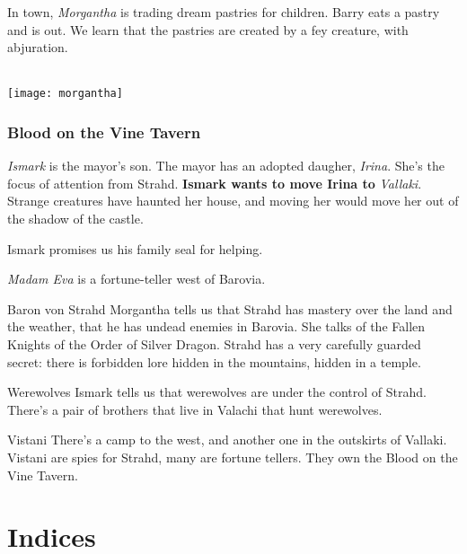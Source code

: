 \documentclass[10pt,twoside,twocolumn]{article}
\begin{document}
In town, \emph{Morgantha} is trading dream
pastries for children. Barry eats a pastry and is
out. We learn that the pastries are created by a fey creature, with abjuration.
\\\\
\centerline{\texttt{[image: morgantha]}}

\subsubsection{Blood on the Vine Tavern}
\textit{Ismark} is the mayor's son. The
mayor has an adopted daugher,
\textit{Irina}. She's the focus of attention
from Strahd. \textbf{Ismark wants to move Irina to }\emph{Vallaki}. Strange creatures
have haunted her house, and moving her would move her out of the
shadow of the castle.

Ismark promises us his family seal for helping.

\emph{Madam Eva} is a fortune-teller west of Barovia.

\begin{paperbox}{Baron von Strahd}
Morgantha tells us that Strahd has mastery over the land and the
weather, that he has undead enemies in Barovia. She talks of the
Fallen Knights of the Order of Silver Dragon. Strahd has a very carefully
guarded secret: there is forbidden lore hidden in the mountains,
hidden in a temple.
\end{paperbox}

\begin{paperbox}{Werewolves}
  Ismark tells us that werewolves are under the control of Strahd. There's a pair of brothers that live in Valachi that hunt werewolves.
\end{paperbox}

\begin{paperbox}{Vistani}
  There's a camp to the west, and another one in the outskirts of
  Vallaki. Vistani are spies for Strahd, many are fortune tellers. They
  own the Blood on the Vine Tavern.
\end{paperbox}
\clearpage
\section{Indices}
\end{document}
